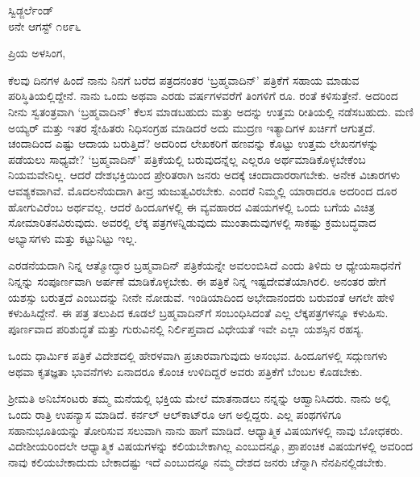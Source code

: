 \begin{flushright}
ಸ್ವಿಡ್ಜರ್ಲೆಂಡ್\\೮ನೇ ಆಗಸ್ಟ್ ೧೮೯೬
\end{flushright}

\noindent
ಪ್ರಿಯ ಅಳಸಿಂಗ,

ಕೆಲವು ದಿನಗಳ ಹಿಂದೆ ನಾನು ನಿನಗೆ ಬರೆದ ಪತ್ರದನಂತರ ‘ಬ್ರಹ್ಮವಾದಿನ್’ ಪತ್ರಿಕೆಗೆ ಸಹಾಯ ಮಾಡುವ ಪರಿಸ್ಥಿತಿಯಲ್ಲಿದ್ದೇನೆ. ನಾನು ಒಂದು ಅಥವಾ ಎರಡು ವರ್ಷಗಳವರೆಗೆ ತಿಂಗಳಿಗೆ ರೂ.  ರಂತೆ ಕಳಿಸುತ್ತೇನೆ. ಅದರಿಂದ ನೀನು ಸ್ವತಂತ್ರವಾಗಿ ‘ಬ್ರಹ್ಮವಾದಿನ್’ ಕೆಲಸ ಮಾಡಬಹುದು ಮತ್ತು ಅದನ್ನು ಉತ್ತಮ ರೀತಿಯಲ್ಲಿ ನಡೆಸಬಹುದು. ಮಣಿ ಅಯ್ಯರ್ ಮತ್ತು ಇತರ ಸ್ನೇಹಿತರು ನಿಧಿಸಂಗ್ರಹ ಮಾಡಿದರೆ ಅದು ಮುದ್ರಣ ಇತ್ಯಾದಿಗಳ ಖರ್ಚಿಗೆ ಆಗುತ್ತದೆ. ಚಂದಾದಿಂದ ಎಷ್ಟು ಆದಾಯ ಬರುತ್ತಿದೆ? ಅದರಿಂದ ಲೇಖಕರಿಗೆ ಹಣವನ್ನು ಕೊಟ್ಟು ಉತ್ತಮ ಲೇಖನಗಳನ್ನು ಪಡೆಯಲು ಸಾಧ್ಯವೇ? ‘ಬ್ರಹ್ಮವಾದಿನ್’ ಪತ್ರಿಕೆಯಲ್ಲಿ ಬರುವುದನ್ನೆಲ್ಲ ಎಲ್ಲರೂ ಅರ್ಥಮಾಡಿಕೊಳ್ಳಬೇಕೆಂಬ ನಿಯಮವೇನಿಲ್ಲ. ಆದರೆ ದೇಶಭಕ್ತಿಯಿಂದ ಪ್ರೇರಿತರಾಗಿ ಜನರು ಅದಕ್ಕೆ ಚಂದಾದಾರರಾಗಬೇಕು. ಅನೇಕ ವಿಚಾರಗಳು ಆವಶ್ಯಕವಾಗಿವೆ. ಮೊದಲನೆಯದಾಗಿ ತೀವ್ರ ಋಜುತ್ವವಿರಬೇಕು. ಎಂದರೆ ನಿಮ್ಮಲ್ಲಿ ಯಾರಾದರೂ ಅದರಿಂದ ದೂರ ಹೋಗುವಿರೆಂಬ ಅರ್ಥವಲ್ಲ. ಆದರೆ ಹಿಂದೂಗಳಲ್ಲಿ ಈ ವ್ಯವಹಾರದ ವಿಷಯಗಳಲ್ಲಿ ಒಂದು ಬಗೆಯ ವಿಚಿತ್ರ ಸೋಮಾರಿತನ\break ವಿರುವುದು. ಅವರಲ್ಲಿ ಲೆಕ್ಕ ಪತ್ರಗಳನ್ನಿಡುವುದು ಮುಂತಾದುವುಗಳಲ್ಲಿ ಸಾಕಷ್ಟು ಕ್ರಮಬದ್ಧವಾದ ಅಭ್ಯಾಸಗಳು ಮತ್ತು ಕಟ್ಟುನಿಟ್ಟು ಇಲ್ಲ.

\vspace{0.1cm}

ಎರಡನೆಯದಾಗಿ ನಿನ್ನ ಆತ್ಮೋದ್ಧಾರ ಬ್ರಹ್ಮವಾದಿನ್ ಪತ್ರಿಕೆಯನ್ನೇ ಅವಲಂಬಿಸಿದೆ ಎಂದು ತಿಳಿದು ಆ ಧ್ಯೇಯಸಾಧನೆಗೆ ನಿನ್ನನ್ನು ಸಂಪೂರ್ಣವಾಗಿ ಅರ್ಪಣೆ ಮಾಡಿಕೊಳ್ಳಬೇಕು. ಈ ಪತ್ರಿಕೆ ನಿನ್ನ ಇಷ್ಟದೇವತೆಯಾಗಿರಲಿ. ಅನಂತರ ಹೇಗೆ ಯಶಸ್ಸು ಬರುತ್ತದೆ ಎಂಬುದನ್ನು ನೀನೇ ನೋಡುವೆ. ಇಂಡಿಯಾದಿಂದ ಅಭೇದಾನಂದರು ಬರುವಂತೆ ಆಗಲೇ ಹೇಳಿ ಕಳುಹಿಸಿದ್ದೇನೆ. ಈ ಪತ್ರ ತಲುಪಿದ ಕೂಡಲೆ ಬ್ರಹ್ಮವಾದಿನ್‌ಗೆ ಸಂಬಂಧಿಸಿದಂತೆ ಎಲ್ಲ ಲೆಕ್ಕಪತ್ರಗಳನ್ನೂ ಕಳುಹಿಸು. ಪೂರ್ಣವಾದ ಪರಿಶುದ್ಧತೆ ಮತ್ತು ಗುರುವಿನಲ್ಲಿ ನಿರ್ಲಿಪ್ತವಾದ ವಿಧೇಯತೆ ಇವೇ ಎಲ್ಲಾ ಯಶಸ್ಸಿನ ರಹಸ್ಯ.

\vspace{0.1cm}

ಒಂದು ಧಾರ್ಮಿಕ ಪತ್ರಿಕೆ ವಿದೇಶದಲ್ಲಿ ಹೇರಳವಾಗಿ ಪ್ರಚಾರವಾಗುವುದು ಅಸಂಭವ. ಹಿಂದೂಗಳಲ್ಲಿ ಸದ್ಗುಣಗಳು ಅಥವಾ ಕೃತಜ್ಞತಾ ಭಾವನೆಗಳು ಏನಾದರೂ ಕೊಂಚ ಉಳಿದಿದ್ದರೆ ಅವರು ಪತ್ರಿಕೆಗೆ ಬೆಂಬಲ ಕೊಡಬೇಕು.

\vspace{0.1cm}

ಶ‍್ರೀಮತಿ ಅನಿಬೆಸಂಟರು ತಮ್ಮ ಮನೆಯಲ್ಲಿ ಭಕ್ತಿಯ ಮೇಲೆ ಮಾತನಾಡಲು ನನ್ನನ್ನು ಆಹ್ವಾನಿಸಿದರು. ನಾನು ಅಲ್ಲಿ ಒಂದು ರಾತ್ರಿ ಉಪನ್ಯಾಸ ಮಾಡಿದೆ. ಕರ್ನಲ್‌ ಆಲ್‌ಕಾಟ್‌ರೂ ಆಗ ಅಲ್ಲಿದ್ದರು. ಎಲ್ಲ ಪಂಥಗಳಿಗೂ ಸಹಾನುಭೂತಿಯನ್ನು ತೋರಿಸುವ ಸಲುವಾಗಿ ನಾನು ಹಾಗೆ ಮಾಡಿದೆ. ಆಧ್ಯಾತ್ಮಿಕ ವಿಷಯಗಳಲ್ಲಿ ನಾವು ಬೋಧಕರು. ವಿದೇಶೀಯರಿಂದಲೇ ಆಧ್ಯಾತ್ಮಿಕ ವಿಷಯಗಳನ್ನು ಕಲಿಯಬೇಕಾಗಿಲ್ಲ ಎಂಬುದನ್ನೂ, ಪ್ರಾಪಂಚಿಕ ವಿಷಯಗಳಲ್ಲಿ ಅವರಿಂದ ನಾವು ಕಲಿಯಬೇಕಾದುದು ಬೇಕಾದಷ್ಟು ಇದೆ ಎಂಬುದನ್ನೂ ನಮ್ಮ ದೇಶದ ಜನರು ಚೆನ್ನಾಗಿ ನೆನಪಿನಲ್ಲಿಡಬೇಕು.

